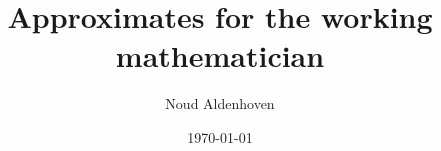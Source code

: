 \documentclass[10pt]{article}
\theoremstyle{definition}
\begin{document}
\title{Approximates for the working mathematician}
\author{Noud Aldenhoven}
\date{\today}
\maketitle


\end{document}
